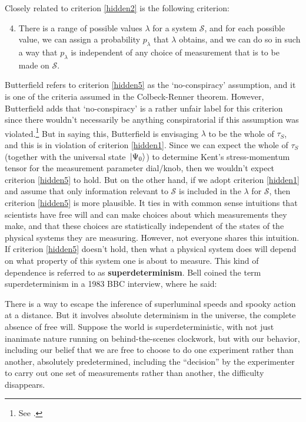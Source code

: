 Closely related to criterion \ref{hidden2} is the following criterion: 
\begin{enumerate}
	\setcounter{enumi}{3}
	\item \label{hidden5} There is a range of possible values $\lambda$ for a system $\mathcal{S}$, and for each possible value, we can assign a probability $p_\lambda$ that $\lambda$ obtains, and we can do so in such a way that $p_\lambda$ is independent of any choice of measurement that is to be made on $\mathcal{S}$.
\end{enumerate} 
Butterfield refers to criterion \ref{hidden5} as the `no-conspiracy' assumption, and it is one of the criteria assumed in the Colbeck-Renner theorem. However, Butterfield adds that `no-conspiracy' is a rather unfair label for this criterion since there wouldn't necessarily be anything conspiratorial if this assumption was violated.\footnote{See \cite[34]{Butterfield}.} But in saying this, Butterfield is envisaging $\lambda$ to be the whole of $\tau_S$, and this is in violation of criterion \ref{hidden1}. Since we can expect the whole of $\tau_S$ (together with the universal state $\ket*{\Psi_0}$) to determine Kent's stress-momentum tensor for the measurement parameter dial/knob, then we wouldn't expect criterion \ref{hidden5} to hold. But on the other hand, if we adopt criterion \ref{hidden1} and assume that only information relevant to $\mathcal{S}$ is included in the $\lambda$ for $\mathcal{S}$, then criterion \ref{hidden5} is more plausible. It ties in with common sense intuitions that scientists have free will and can make choices about which measurements they make, and that these choices are statistically independent of the states of the physical systems they are measuring. However, not everyone shares this intuition. If criterion \ref{hidden5} doesn't hold, then what a physical system does will depend on what property of this system one is about to measure. This kind of dependence is referred to as \textbf{superdeterminism}. Bell coined the term superdeterminism in a 1983 BBC interview, where he said:  
\begin{adjustwidth}{1cm}{}
	\begin{displayquote}
		There is a way to escape the inference of superluminal speeds and spooky action at a distance. But it involves absolute determinism in the universe, the complete absence of free will. Suppose the world is superdeterministic, with not just inanimate nature running on behind-the-scenes clockwork, but with our behavior, including our belief that we are free to choose to do one experiment rather than another, absolutely predetermined, including the ``decision'' by the experimenter to carry out one set of measurements rather than another, the difficulty disappears.
	\end{displayquote}
\end{adjustwidth}
